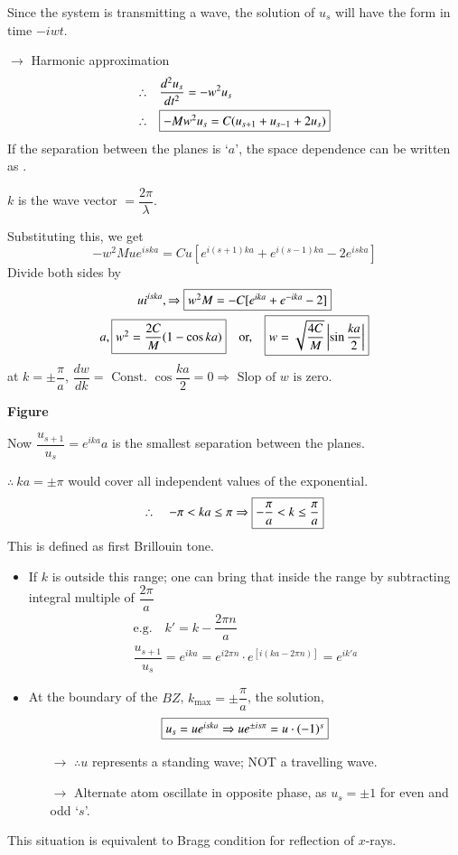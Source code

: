 Since the system is transmitting a wave, the solution of $u_{s}$ will have the form in time $-iwt$.

$\to$ Harmonic approximation
\begin{align*}
\therefore\quad & \dfrac{d^{2}u_{s}}{dt^{2}}=-w^{2}u_{s}\\
\therefore\quad & \fbox{$-Mw^{2}u_{s}=C(u_{s+1}+u_{s-1}+2u_{s})$}
\end{align*}
If the separation between the planes is `$a$', the space dependence can be written as .

$k$ is the wave vector $=\dfrac{2\pi}{\lambda}$.

Substituting this, we get
$$
-w^{2}Mue^{iska}=Cu\left[e^{i(s+1)ka}+e^{i(s-1)ka}-2e^{iska}\right]
$$
Divide both sides by
\begin{gather*}
ui^{iska},\Rightarrow \fbox{$w^{2}M=-C[e^{ika}+e^{-ika}-2]$}\\
a, \fbox{$w^{2}=\dfrac{2C}{M}(1-\cos ka)$}\quad \text{or,}\quad \fbox{$w=\sqrt{\dfrac{4C}{M}}\left|\sin \dfrac{ka}{2}\right|$}
\end{gather*}
at $k=\pm \dfrac{\pi}{a}$, $\dfrac{dw}{dk}=\text{ Const. } \cos \dfrac{ka}{2}=0\Rightarrow \text{ Slop of $w$ is zero.}$
\begin{center}
{\bf Figure}
\end{center}
Now $\dfrac{u_{s+1}}{u_{s}}=e^{ika}$\quad $a$ is the smallest separation between the planes.

$\therefore \ ka=\pm \pi$ would cover all independent values of the exponential.
$$
\therefore\quad -\pi <ka\leq \pi \Rightarrow \fbox{$-\dfrac{\pi}{a}<k\leq \dfrac{\pi}{a}$}
$$
This is defined as first Brillouin tone.
\begin{itemize}
\item If $k$ is outside this range; one can bring that inside the range by subtracting integral multiple of $\dfrac{2\pi}{a}$
\begin{gather*}
\text{e.g.}\quad k'=k-\dfrac{2\pi n}{a}\\
\dfrac{u_{s+1}}{u_{s}}=e^{ika}=e^{i2\pi n}\cdot e^{[i(ka-2\pi n)]}=e^{ik'a}
\end{gather*}

\item At the boundary of the $BZ$, $k_{\max}=\pm \dfrac{\pi}{a}$, the solution,
$$
\fbox{$u_{s}=ue^{iska}\Rightarrow ue^{\pm is\pi}=u\cdot (-1)^{s}$}
$$
\begin{itemize}
\item[$\to$] $\therefore u$ represents a standing wave; NOT a travelling wave.

\item[$\to$] Alternate atom oscillate in opposite phase, as $u_{s}=\pm 1$ for even and odd `$s$'.
\end{itemize}
\end{itemize}
This situation is equivalent to Bragg condition for reflection of $x$-rays.

